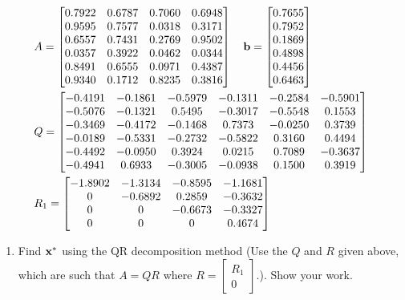 \documentclass{article}
\newcommand{\bx}{{\bf x}}
\newcommand{\bb}{{\bf b}}
\begin{document}
\begin{itemize}
          \begin{align*}
               & A = \left[\begin{matrix} 0.7922 & 0.6787 & 0.7060 & 0.6948 \\ 0.9595 & 0.7577 & 0.0318 & 0.3171 \\ 0.6557 & 0.7431 & 0.2769 & 0.9502 \\ 0.0357 & 0.3922 & 0.0462 & 0.0344 \\ 0.8491 & 0.6555 & 0.0971 & 0.4387 \\ 0.9340 & 0.1712 & 0.8235 & 0.3816 \end{matrix} \right] \quad \bb = \left[\begin{matrix} 0.7655 \\ 0.7952 \\ 0.1869 \\ 0.4898 \\ 0.4456 \\ 0.6463 \end{matrix}\right] \\
               & Q = \left[\begin{matrix} -0.4191 & -0.1861 & -0.5979 & -0.1311 & -0.2584 & -0.5901 \\ -0.5076 & -0.1321 & 0.5495 & -0.3017 & -0.5548 & 0.1553 \\ -0.3469 & -0.4172 & -0.1468 & 0.7373 & -0.0250 & 0.3739 \\ -0.0189 & -0.5331 & -0.2732 & -0.5822 & 0.3160 & 0.4494 \\ -0.4492 & -0.0950 & 0.3924 & 0.0215 & 0.7089 & -0.3637 \\ -0.4941 & 0.6933 & -0.3005 & -0.0938 & 0.1500 & 0.3919 \end{matrix}\right]                                                      \\
               & R_1 = \left[\begin{matrix} -1.8902 & -1.3134 & -0.8595 & -1.1681 \\ 0 & -0.6892 & 0.2859 & -0.3632 \\ 0 & 0 & -0.6673 & -0.3327 \\ 0 & 0 & 0 & 0.4674 \end{matrix}\right]
          \end{align*}
          \begin{enumerate}
              \item Find $\bx^{*}$ using the QR decomposition method (Use the $Q$ and $R$ given above, which are such that $A = QR$ where $R = \left[\begin{matrix} R_1 \\ 0 \end{matrix}\right]$.). Show your work.

\end{enumerate}
\end{itemize}
\end{document}
